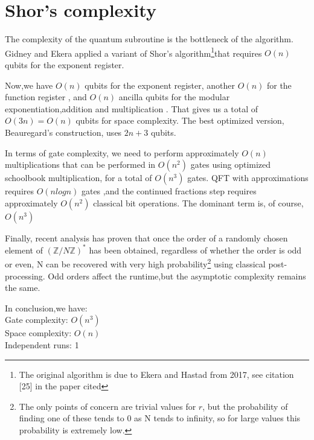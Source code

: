 \chapter{Shor's complexity}

The complexity of the quantum subroutine is the bottleneck of the algorithm. Gidney and Ekera \cite{GidneyEkera2021} applied a variant of Shor's algorithm\footnote{The original algorithm is due to Ekera and Hastad from 2017, see citation [25] in the paper cited}that requires $O(n)$ qubits for the exponent register.

Now,we have $O(n)$ qubits for the exponent register, another $O(n)$ for the function register \cite{Shor1997}, and $O(n)$ ancilla qubits for the modular exponentiation,addition and multiplication \cite{Roetteler2017}. That gives us a total of $O(3n) = O(n)$ qubits for space complexity. The best optimized version, Beauregard's construction, uses $2n+3$ qubits.

In terms of gate complexity, we need to perform approximately $O(n)$ multiplications that can be performed in $O(n^2)$ gates \cite{Regev2025} using optimized schoolbook multiplication, for a total of $O(n^3)$ gates. QFT with approximations requires $O(nlogn)$ gates \cite{NamSuMaslov2020},and the continued fractions step requires approximately $O(n^2)$ classical bit operations\cite{AdamczewskiBugeaud2005}. The dominant term is, of course, $O(n^3)$ 

Finally, recent analysis \cite{Ekera2021} has proven that once the order of a randomly chosen element of $(\mathbb{Z}/N\mathbb{Z})^*$ has been obtained, regardless of whether the order is odd or even, N can be recovered with very high probability\footnote{The only points of concern are trivial values for $r$, but the probability of finding one of these tends to 0 as N tends to infinity, so for large values this probability is extremely low.} using classical post-processing. Odd orders affect the runtime,but the asymptotic complexity remains the same.

In conclusion,we have:\\
Gate complexity: $O(n^3)$\\
Space complexity: $O(n)$\\
Independent runs: 1\\








